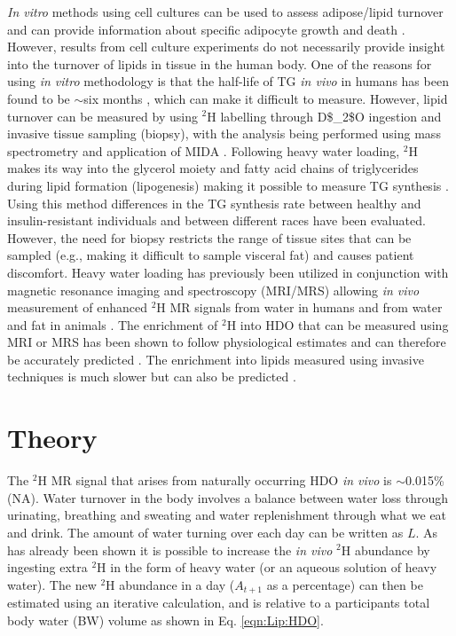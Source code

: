 \textit{In vitro} methods using cell cultures can be used to assess adipose/lipid turnover and can provide information about specific adipocyte growth and death \cite{Tchkonia2002FatPreadipocytes}. However, results from cell culture experiments do not necessarily provide insight into the turnover of lipids in tissue in the human body. One of the reasons for using \textit{in vitro} methodology is that the half-life of \ac{TG} \textit{in vivo} in humans has been found to be $\sim$six months \cite{Strawford2004AdiposeO}, which can make it difficult to measure. However, lipid turnover can be measured by using $^2$H labelling through \ac{D$_2$O} ingestion and invasive tissue sampling (biopsy), with the analysis being performed using mass spectrometry and application of \ac{MIDA} \cite{White2019DynamicsDisease, Strawford2004AdiposeO, Belew2022DeTracers, Turner2003MeasurementMIDA}. Following heavy water loading, $^2$H makes its way into the glycerol moiety and fatty acid chains of triglycerides during lipid formation (lipogenesis) making it possible to measure TG synthesis \cite{Turner2003MeasurementMIDA}. Using this method differences in the \ac{TG} synthesis rate between healthy and insulin-resistant individuals \cite{Allister2015InHumans} and between different races \cite{White2018RacialHumans} have been evaluated. However, the need for biopsy restricts the range of tissue sites that can be sampled (e.g., making it difficult to sample visceral fat) and causes patient discomfort. Heavy water loading has previously been utilized in conjunction with magnetic resonance imaging and spectroscopy (\ac{MRI}/\ac{MRS}) allowing \textit{in vivo} measurement of enhanced $^2$H MR signals from water in humans and from water and fat in animals \cite{Brereton1989TheMice, Cocking2023DeuteriumDosing}. The enrichment of $^2$H into \ac{HDO} that can be measured using \ac{MRI} or \ac{MRS} has been shown to follow physiological estimates and can therefore be accurately predicted \cite{Cocking2023DeuteriumDosing}. The enrichment into lipids measured using invasive techniques is much slower \cite{White2019DynamicsDisease, Strawford2004AdiposeO} but can also be predicted \cite{White2019DynamicsDisease}.

\section{Theory}
\label{Chap:Lip:Theory}

The $^2$H MR signal that arises from naturally occurring \ac{HDO} \textit{in vivo} is $\sim$0.015\% (NA). Water turnover in the body involves a balance between water loss through urinating, breathing and sweating and water replenishment through what we eat and drink. The amount of water turning over each day can be written as $L$. As has already been shown it is possible to increase the \textit{in vivo} $^2$H abundance by ingesting extra $^2$H in the form of heavy water (or an aqueous solution of heavy water). The new $^2$H abundance in a day ($A_{t+1}$ as a percentage) can then be estimated using an iterative calculation, and is relative to a participants total body water (BW) volume as shown in Eq. \ref{eqn:Lip:HDO}.

